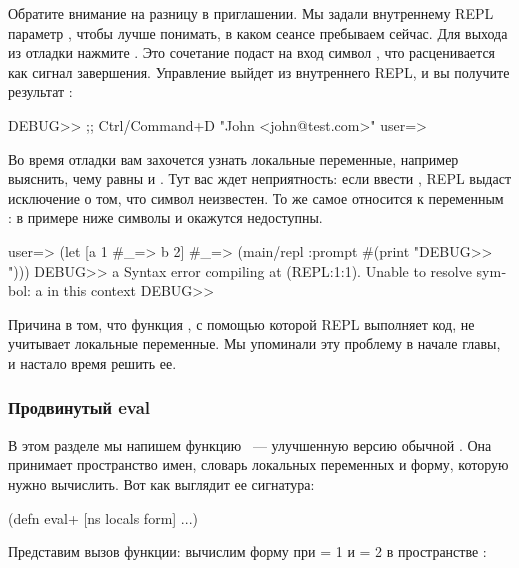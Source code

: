 Обратите внимание на разницу в приглашении. Мы задали внутреннему REPL параметр , чтобы лучше понимать, в каком сеансе пребываем сейчас. Для выхода из отладки нажмите . Это сочетание подаст на вход символ , что расценивается как сигнал завершения. Управление выйдет из внутреннего REPL, и вы получите результат :

\begin{english}
  \begin{text}
DEBUG>> ;; Ctrl/Command+D
"John <john@test.com>"
user=>
  \end{text}
\end{english}

Во время отладки вам захочется узнать локальные переменные, например выяснить, чему равны  и . Тут вас ждет неприятность: если ввести , REPL выдаст исключение о том, что символ неизвестен. То же самое относится к переменным : в примере ниже символы  и  окажутся недоступны.

\begin{english}
  \begin{text}
user=> (let [a 1
  #_=>       b 2]
  #_=>   (main/repl :prompt #(print "DEBUG>> ")))
DEBUG>> a
Syntax error compiling at (REPL:1:1).
Unable to resolve symbol: a in this context
DEBUG>>
  \end{text}
\end{english}

Причина в том, что функция , с помощью которой REPL выполняет код, не учитывает локальные переменные. Мы упоминали эту проблему в начале главы, и настало время решить ее.

\subsubsection{Продвинутый eval}

В этом разделе мы напишем функцию ~--- улучшенную версию обычной . Она принимает пространство имен, словарь локальных переменных и форму, которую нужно вычислить. Вот как выглядит ее сигнатура:

\begin{english}
  \begin{clojure}
(defn eval+ [ns locals form]
  ...)
  \end{clojure}
\end{english}

Представим вызов функции: вычислим форму  при  = 1 и  = 2 в пространстве :

